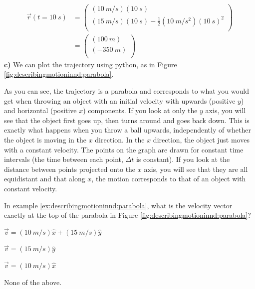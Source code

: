 \begin{example}
\begin{align*}
\vec r(t=\SI{10}{s})&= \begin{pmatrix}
           (\SI{10}{m/s})(\SI{10}{s}) \\
           (\SI{15}{m/s})(\SI{10}{s})-\frac{1}{2}(\SI{10}{m/s^2})(\SI{10}{s})^2 \\
         \end{pmatrix}\\
         &= \begin{pmatrix}
           (\SI{100}{m}) \\
           (\SI{-350}{m})\\
         \end{pmatrix}
\end{align*}
\textbf{c)} We can plot the trajectory using python, as in Figure \ref{fig:describingmotioninnd:parabola}.

As you can see, the trajectory is a parabola and corresponds to what you would get when throwing an object with an initial velocity with upwards (positive $y$) and horizontal (positive $x$) components. If you look at only the $y$ axis, you will see that the object first goes up, then turns around and goes back down. This is exactly what happens when you throw a ball upwards, independently of whether the object is moving in the $x$ direction. In the $x$ direction, the object just moves with a constant velocity. The points on the graph are drawn for constant time intervals (the time between each point, $\Delta t$ is constant). If you look at the distance between points projected onto the $x$ axis, you will see that they are all equidistant and that along $x$, the motion corresponds to that of an object with constant velocity. 
\end{example}
\newpage
\begin{checkpoint}{\begin{MCquestion}{In example \ref{ex:describingmotioninnd:parabola}, what is the velocity vector exactly at the top of the parabola in Figure \ref{fig:describingmotioninnd:parabola}?}
\item $\vec v=(\SI{10}{m/s})\hat x+(\SI{15}{m/s})\hat y$
\item $\vec v=(\SI{15}{m/s})\hat y$
\item $\vec v=(\SI{10}{m/s})\hat x$ \correct
\item None of the above.
\end{MCquestion}}
\end{checkpoint}

